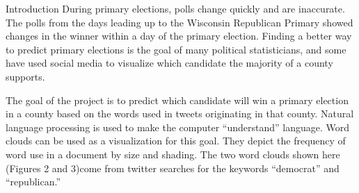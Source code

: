 \documentclass[final]{beamer}
\newlength{\onecolwid}
\begin{document}
\begin{frame}[t]
\begin{columns}[t]
\begin{column}{\onecolwid}
%
%
%
\begin{block}{Introduction}
	During primary elections, polls change quickly and are inaccurate.  The polls from the days leading up to the Wisconsin Republican Primary showed changes in the winner within a day of the primary election.  Finding a better way to predict primary elections is the goal of many political statisticians, and some have used social media to visualize which candidate the majority of a county supports. 
	
	The goal of the project is to predict which candidate will win a primary election in a county based on the words used in tweets originating in that county.  Natural language processing is used to make the computer ``understand'' language. Word clouds can be used as a visualization for this goal.  They depict the frequency of word use in a document by size and shading.  The two word clouds shown here (Figures 2 and 3)come from twitter searches for the keywords ``democrat'' and ``republican.''  
	

\end{block}
\end{column}
\end{columns}
\end{frame}
\end{document}
